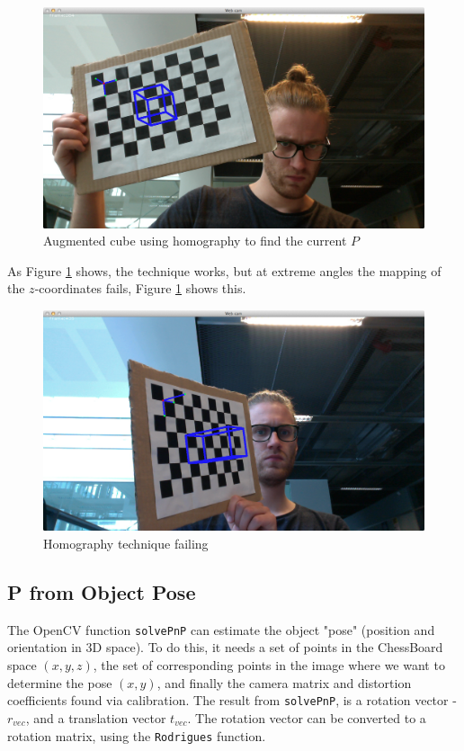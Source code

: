 \documentclass[a4paper,11pt]{article}
\begin{document}
\begin{figure}[H]
\begin{centering}
\includegraphics[width=0.8\linewidth]{cube_from_homography}
\caption{Augmented cube using homography to find the current $P$}
\label{fig:cube_from_homography}
\end{centering}
\end{figure}

As Figure \ref{fig:cube_from_homography} shows, the technique works, but at extreme angles the mapping of the $z$-coordinates fails, Figure \ref{fig:cube_from_homography} shows this.\\


\begin{figure}[H]
\centering
\includegraphics[width=0.8\linewidth]{cube_from_homography_fail}
\caption{Homography technique failing}
\label{fig:cube_from_homography_fail}
\end{figure}
\subsection{P from Object Pose}
The OpenCV function \texttt{solvePnP} can estimate the object "pose" (position and orientation in 3D space). To do this, it needs a set of points in the ChessBoard space $(x, y, z)$, the set of corresponding points in the image where we want to determine the pose $(x, y)$, and finally the camera matrix and distortion coefficients found via calibration. The result from \texttt{solvePnP}, is a rotation vector - $r_{vec}$, and a translation vector $t_{vec}$. The rotation vector can be converted to a rotation matrix, using the \texttt{Rodrigues} function.
\end{document}

